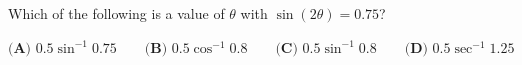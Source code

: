 Which of the following is a value of $\theta$ with $\sin(2\theta)=0.75$?

$\textbf{(A) } 0.5\sin^{-1}0.75\qquad\textbf{(B) } 0.5\cos^{-1}0.8\qquad\textbf{(C) } 0.5\sin^{-1}0.8\qquad\textbf{(D) } 0.5\sec^{-1}1.25$
